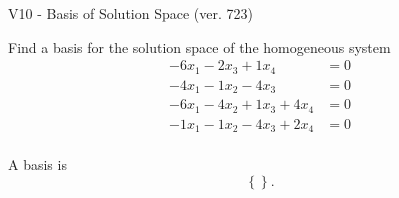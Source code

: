 \begin{exercise}
  \begin{exerciseTitle}V10 - Basis of Solution Space (ver. 723)\end{exerciseTitle}
  \begin{exerciseStatement}
    Find a basis for the solution space of the homogeneous system 
\begin{align*}
 -6 x_ 1 -2 x_ 3 + 1 x_ 4 &= 0  \\ 
  -4 x_ 1 -1 x_ 2 -4 x_ 3 &= 0  \\ 
  -6 x_ 1 -4 x_ 2 + 1 x_ 3 + 4 x_ 4 &= 0  \\ 
  -1 x_ 1 -1 x_ 2 -4 x_ 3 + 2 x_ 4 &= 0  \\ 
 \end{align*}


 
  \end{exerciseStatement}

  \begin{exerciseAnswer}
   A basis is   
\[\left\{\right\}.\]

  


  \end{exerciseAnswer}
\end{exercise}